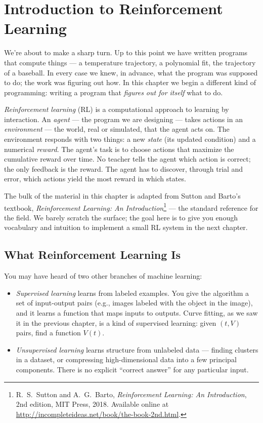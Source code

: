 \documentclass[../../book.tex]{subfiles}
\begin{document}
\chapter{Introduction to Reinforcement Learning}
\label{rl_intro}


We're about to make a sharp turn.  Up to this point we have written programs that compute things --- a temperature trajectory, a polynomial fit, the trajectory of a baseball.  In every case we knew, in advance, what the program was supposed to do; the work was figuring out how.  In this chapter we begin a different kind of programming: writing a program that \emph{figures out for itself} what to do.


\emph{Reinforcement learning} (RL) is a computational approach to learning by interaction.  An \emph{agent} --- the program we are designing --- takes actions in an \emph{environment} --- the world, real or simulated, that the agent acts on.  The environment responds with two things: a new \emph{state} (its updated condition) and a numerical \emph{reward}.  The agent's task is to choose actions that maximize the cumulative reward over time.  No teacher tells the agent which action is correct; the only feedback is the reward.  The agent has to discover, through trial and error, which actions yield the most reward in which states.

The bulk of the material in this chapter is adapted from Sutton and Barto's textbook, \emph{Reinforcement Learning: An Introduction}\footnote{R.~S.~Sutton and A.~G.~Barto, \emph{Reinforcement Learning: An Introduction}, 2nd edition, MIT Press, 2018.  Available online at \url{http://incompleteideas.net/book/the-book-2nd.html}.} --- the standard reference for the field.  We barely scratch the surface; the goal here is to give you enough vocabulary and intuition to implement a small RL system in the next chapter.

\section{What Reinforcement Learning Is}


You may have heard of two other branches of machine learning:

\begin{itemize}
    \item \emph{Supervised learning} learns from labeled examples.  You give the algorithm a set of input-output pairs (e.g., images labeled with the object in the image), and it learns a function that maps inputs to outputs.  Curve fitting, as we saw it in the previous chapter, is a kind of supervised learning: given $(t, V)$ pairs, find a function $V(t)$.
    \item \emph{Unsupervised learning} learns structure from unlabeled data --- finding clusters in a dataset, or compressing high-dimensional data into a few principal components.  There is no explicit ``correct answer'' for any particular input.
\end{itemize}
\end{document}

